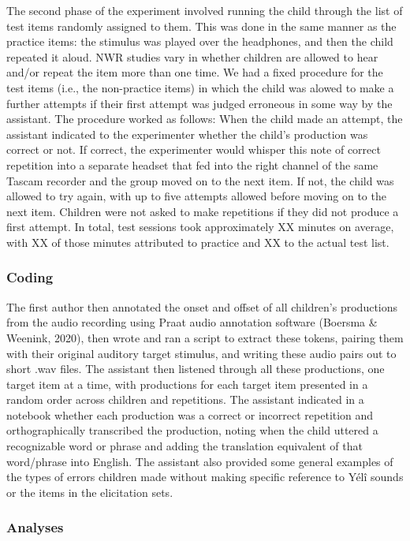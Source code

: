\documentclass[english,,man,floatsintext]{apa6}
\begin{document}
The second phase of the experiment involved running the child through the list of test items randomly assigned to them. This was done in the same manner as the practice items: the stimulus was played over the headphones, and then the child repeated it aloud. NWR studies vary in whether children are allowed to hear and/or repeat the item more than one time. We had a fixed procedure for the test items (i.e., the non-practice items) in which the child was alowed to make a further attempts if their first attempt was judged erroneous in some way by the assistant. The procedure worked as follows: When the child made an attempt, the assistant indicated to the experimenter whether the child's production was correct or not. If correct, the experimenter would whisper this note of correct repetition into a separate headset that fed into the right channel of the same Tascam recorder and the group moved on to the next item. If not, the child was allowed to try again, with up to five attempts allowed before moving on to the next item. Children were not asked to make repetitions if they did not produce a first attempt. In total, test sessions took approximately XX minutes on average, with XX of those minutes attributed to practice and XX to the actual test list.

\hypertarget{coding}{%
\subsubsection{Coding}\label{coding}}

The first author then annotated the onset and offset of all children's productions from the audio recording using Praat audio annotation software (Boersma \& Weenink, 2020),
then wrote and ran a script to extract these tokens, pairing them with their original auditory target stimulus, and writing these audio pairs out to short .wav files. The assistant then listened through all these productions, one target item at a time, with productions for each target item presented in a random order across children and repetitions. The assistant indicated in a notebook whether each production was a correct or incorrect repetition and orthographically transcribed the production, noting when the child uttered a recognizable word or phrase and adding the translation equivalent of that word/phrase into English. The assistant also provided some general examples of the types of errors children made without making specific reference to Yélî sounds or the items in the elicitation sets.

\hypertarget{analyses}{%
\subsubsection{Analyses}\label{analyses}}
\end{document}
